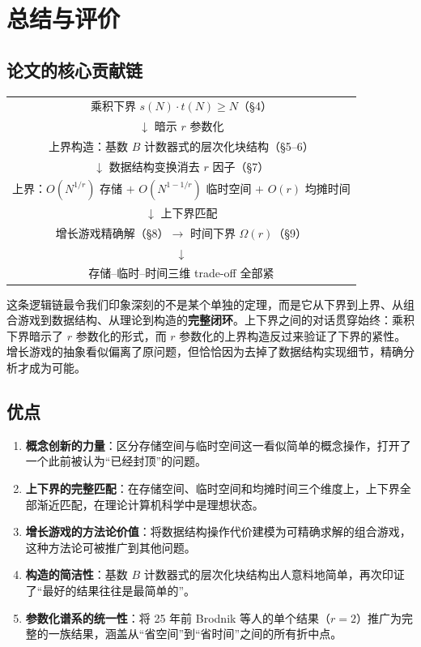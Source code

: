 \documentclass[12pt,a4paper]{ctexart}
\begin{document}
\section{总结与评价}

\subsection{论文的核心贡献链}

\begin{center}
\begin{tabular}{c}
乘积下界 $s(N)\cdot t(N) \ge N$（\S4）\\
\quad $\downarrow$ 暗示 $r$ 参数化 \\
上界构造：基数 $B$ 计数器式的层次化块结构（\S5--6）\\
\quad $\downarrow$ 数据结构变换消去 $r$ 因子（\S7）\\
上界：$O(N^{1/r})$ 存储 $+$ $O(N^{1-1/r})$ 临时空间 $+$ $O(r)$ 均摊时间\\
\quad $\downarrow$ 上下界匹配 \\
增长游戏精确解（\S8）$\to$ 时间下界 $\Omega(r)$（\S9）\\
\quad $\downarrow$ \\
存储--临时--时间三维 trade-off 全部紧
\end{tabular}
\end{center}

这条逻辑链最令我们印象深刻的不是某个单独的定理，而是它从下界到上界、从组合游戏到数据结构、从理论到构造的\textbf{完整闭环}。上下界之间的对话贯穿始终：乘积下界暗示了 $r$ 参数化的形式，而 $r$ 参数化的上界构造反过来验证了下界的紧性。增长游戏的抽象看似偏离了原问题，但恰恰因为去掉了数据结构实现细节，精确分析才成为可能。

\subsection{优点}

\begin{enumerate}[leftmargin=*]
    \item \textbf{概念创新的力量}：区分存储空间与临时空间这一看似简单的概念操作，打开了一个此前被认为``已经封顶''的问题。
    \item \textbf{上下界的完整匹配}：在存储空间、临时空间和均摊时间三个维度上，上下界全部渐近匹配，在理论计算机科学中是理想状态。
    \item \textbf{增长游戏的方法论价值}：将数据结构操作代价建模为可精确求解的组合游戏，这种方法论可被推广到其他问题。
    \item \textbf{构造的简洁性}：基数 $B$ 计数器式的层次化块结构出人意料地简单，再次印证了``最好的结果往往是最简单的''。
    \item \textbf{参数化谱系的统一性}：将 25 年前 Brodnik 等人的单个结果（$r=2$）推广为完整的一族结果，涵盖从``省空间''到``省时间''之间的所有折中点。
\end{enumerate}
\end{document}
